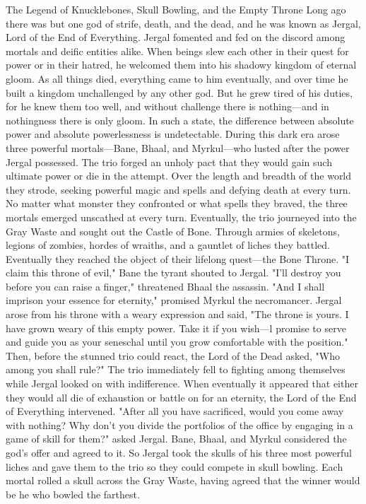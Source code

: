 \documentclass[10pt,a4paper,twoside,twocolumn,openany,bg=print,nodeprecatedcode]{dndbook}
\begin{document}
\begin{DndComment}{The Legend of Knucklebones, Skull Bowling, and the Empty Throne}
Long ago there was but one god of strife, death, and the dead, and he was known as Jergal, Lord of the End of Everything. Jergal fomented and fed on the discord among mortals and deific entities alike. When beings slew each other in their quest for power or in their hatred, he welcomed them into his shadowy kingdom of eternal gloom. As all things died, everything came to him eventually, and over time he built a kingdom unchallenged by any other god. But he grew tired of his duties, for he knew them too well, and without challenge there is nothing—and in nothingness there is only gloom. In such a state, the difference between absolute power and absolute powerlessness is undetectable.
During this dark era arose three powerful mortals—Bane, Bhaal, and Myrkul—who lusted after the power Jergal possessed. The trio forged an unholy pact that they would gain such ultimate power or die in the attempt. Over the length and breadth of the world they strode, seeking powerful magic and spells and defying death at every turn. No matter what monster they confronted or what spells they braved, the three mortals emerged unscathed at every turn. Eventually, the trio journeyed into the Gray Waste and sought out the Castle of Bone. Through armies of skeletons, legions of zombies, hordes of wraiths, and a gauntlet of liches they battled. Eventually they reached the object of their lifelong quest—the Bone Throne.
"I claim this throne of evil," Bane the tyrant shouted to Jergal.
"I'll destroy you before you can raise a finger," threatened Bhaal the assassin.
"And I shall imprison your essence for eternity," promised Myrkul the necromancer.
Jergal arose from his throne with a weary expression and said, "The throne is yours. I have grown weary of this empty power. Take it if you wish—l promise to serve and guide you as your seneschal until you grow comfortable with the position." Then, before the stunned trio could react, the Lord of the Dead asked, "Who among you shall rule?"
The trio immediately fell to fighting among themselves while Jergal looked on with indifference. When eventually it appeared that either they would all die of exhaustion or battle on for an eternity, the Lord of the End of Everything intervened.
"After all you have sacrificed, would you come away with nothing? Why don't you divide the portfolios of the office by engaging in a game of skill for them?" asked Jergal.
Bane, Bhaal, and Myrkul considered the god's offer and agreed to it. So Jergal took the skulls of his three most powerful liches and gave them to the trio so they could compete in skull bowling. Each mortal rolled a skull across the Gray Waste, having agreed that the winner would be he who bowled the farthest.

\end{DndComment}
\end{document}
